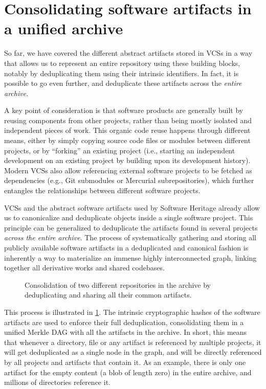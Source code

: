 \section{Consolidating software artifacts in a unified archive}%
\label{sec:consolidation}

So far, we have covered the different abstract artifacts stored in \glspl{VCS}
in a way that allows us to represent an entire repository using these building
blocks, notably by deduplicating them using their intrinsic identifiers.
In fact, it is possible to go even further, and deduplicate these artifacts
across the \emph{entire archive}.

A key point of consideration is that software products are generally built by
reusing components from other projects, rather than being mostly isolated and
independent pieces of work. This organic code reuse happens through different
means, either by simply copying source code files or modules between different
projects, or by ``forking'' an existing project (i.e., starting an independent
development on an existing project by building upon its development history).
Modern \glspl{VCS} also allow referencing external software projects to be
fetched as dependencies (e.g., Git submodules or Mercurial subrepositories),
which further entangles the relationships between different software projects.

\glspl{VCS} and the abstract software artifacts used by Software Heritage
already allow us to canonicalize and deduplicate objects inside a single
software project. This principle can be generalized to deduplicate the
artifacts found in several projects \emph{across the entire archive}.
The process of systematically gathering and storing all publicly available
software artifacts in a deduplicated and canonical fashion is inherently a way
to materialize an immense highly interconnected graph, linking together all
derivative works and shared codebases.

\begin{figure}
    \centering
    
    \caption{Consolidation of two different repositories in the archive by
    deduplicating and sharing all their common artifacts.}%
    \label{fig:consolidating-archive}
\end{figure}

This process is illustrated in \cref{fig:consolidating-archive}. The
intrinsic cryptographic hashes of the software artifacts are used to enforce
their full deduplication, consolidating them in a unified Merkle \gls{DAG} with
all the artifacts in the archive.
%
In short, this means that whenever a directory, file or any artifact is
referenced by multiple projects, it will get deduplicated as a single node in
the graph, and will be directly referenced by all projects and artifacts
that contain it. As an example, there is only one artifact for the empty
content (a blob of length zero) in the entire archive, and millions of
directories reference it.

